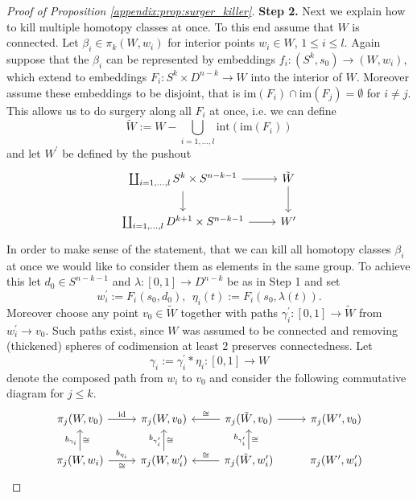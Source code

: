 \begin{proof}[Proof of Proposition \ref{appendix:prop:surger_killer}]
    \noindent \textbf{Step 2.} Next we explain how to kill multiple homotopy classes at once. To this end assume that $W$ is connected. Let $\beta_i \in \pi_k(W,w_i)$ for interior points $w_i \in W$, $1 \leq i \leq l$. Again suppose that the $\beta_i$ can be represented by embeddings $f_i \colon (S^k,s_0) \to (W,w_i)$, which extend to embeddings $F_i \colon S^k \times D^{n-k} \to W$ into the interior of $W$. Moreover assume these embeddings to be disjoint, that is $\mathrm{im}(F_i) \cap \mathrm{im}(F_j) = \emptyset$ for $i \neq j$. This allows us to do surgery along all $F_i$ at once, i.e. we can define 
    \[
    \tilde{W} := W - \bigcup_{i=1,\ldots,l} \mathrm{int}(\mathrm{im}(F_i))
    \]
    and let $W^\prime$ be defined by the pushout 
    \[\begin{tikzcd}
	{\coprod_{i=1,\ldots,l} S^k \times S^{n-k-1}} & {\tilde{W}} \\
	{\coprod_{i=1,\ldots,l}D^{k+1} \times S^{n-k-1}} & {W^\prime}
	\arrow[from=1-1, to=1-2]
	\arrow[from=1-1, to=2-1]
	\arrow[from=1-2, to=2-2]
	\arrow[from=2-1, to=2-2]
    \end{tikzcd}\]
    In order to make sense of the statement, that we can kill all homotopy classes $\beta_i$ at once we would like to consider them as elements in the same group. To achieve this let $d_0 \in S^{n-k-1}$ and $\lambda \colon [0,1] \to D^{n-k}$ be as in Step 1 and set 
    \[
    w_i^\prime := F_i(s_0,d_0), \; \, \eta_i(t) := F_i(s_0,\lambda(t)).
    \]
    Moreover choose any point $v_0 \in \tilde{W}$ together with paths $\gamma_i^\prime \colon [0,1] \to \tilde{W}$ from $w_i^\prime \to v_0$. Such paths exist, since $W$ was assumed to be connected and removing (thickened) spheres of codimension at least $2$ preserves connectedness. Let 
    \[
    \gamma_i := \gamma_i^\prime \ast \eta_i \colon [0,1] \to W
    \]
    denote the composed path from $w_i$ to $v_0$ and consider the following commutative diagram for $j \leq k$.
    \[\begin{tikzcd}
	{\pi_j(W,v_0)} & {\pi_j(W,v_0)} & {\pi_j(\tilde{W},v_0)} & {\pi_j(W^\prime,v_0)} \\
	{\pi_j(W,w_i)} & {\pi_j(W,w_i^\prime)} & {\pi_j(\tilde{W},w_i^\prime)} & {\pi_j(W^\prime,w_i^\prime)}
	\arrow["{\mathrm{id}}", from=1-1, to=1-2]
	\arrow["\cong"', from=1-3, to=1-2]
	\arrow[from=1-3, to=1-4]
	\arrow["{b_{\gamma_i}}", "\cong"', from=2-1, to=1-1]
	\arrow["{b_{\eta_i}}", "\cong"', from=2-1, to=2-2]
	\arrow["{b_{\gamma^\prime_i}}", "\cong"', from=2-2, to=1-2]
	\arrow["{b_{\gamma^\prime_i}}", "\cong"', from=2-3, to=1-3]
	\arrow["\cong"', from=2-3, to=2-2]

\end{tikzcd}\]
\end{proof}
